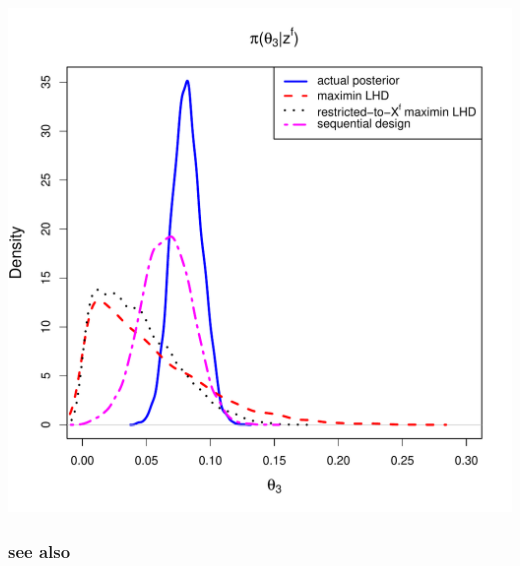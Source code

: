 \documentclass[nopagenumber,9pt]{beamer}
\begin{document}
\begin{frame}
 \vspace{-.2cm}
 \includegraphics[scale=0.22]{ExSobold6_marg3_150.pdf}
 
 
\end{frame}


\begin{frame}
 \frametitle{see also}
 
 \cite{surer2023sequential}
\end{frame}




\end{document}

